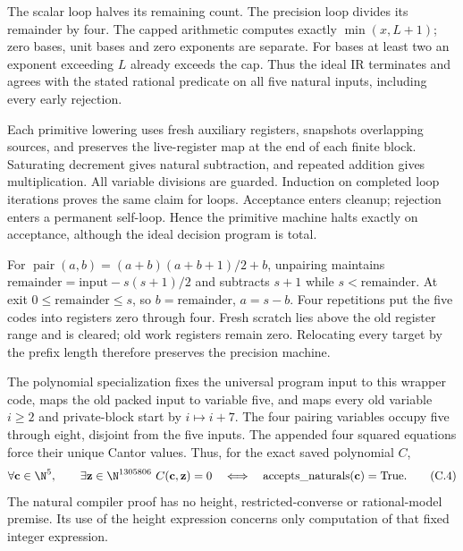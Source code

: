 The scalar loop halves its remaining count. The precision loop divides
its remainder by four. The capped arithmetic computes exactly
$\min(x,L+1)$; zero bases, unit bases and zero exponents are separate.
For bases at least two an exponent exceeding $L$ already exceeds the
cap. Thus the ideal IR terminates and agrees with the stated rational
predicate on all five natural inputs, including every early rejection.

Each primitive lowering uses fresh auxiliary registers, snapshots
overlapping sources, and preserves the live-register map at the end
of each finite block. Saturating decrement gives natural subtraction,
and repeated addition gives multiplication. All variable divisions
are guarded. Induction on completed loop iterations proves the same
claim for loops. Acceptance enters cleanup; rejection enters a
permanent self-loop. Hence the primitive machine halts exactly on
acceptance, although the ideal decision program is total.

For $\operatorname{pair}(a,b)=(a+b)(a+b+1)/2+b$, unpairing maintains
$\text{remainder}=\text{input}-s(s+1)/2$ and subtracts $s+1$
while $s<\text{remainder}$. At exit
$0\le\text{remainder}\le s$, so $b=\text{remainder}$, $a=s-b$.
Four repetitions put the five codes into registers zero through four.
Fresh scratch lies above the old register range and is cleared;
old work registers remain zero. Relocating every target by the prefix
length therefore preserves the precision machine.

The polynomial specialization fixes the universal program input to
this wrapper code, maps the old packed input to variable five, and
maps every old variable $i\ge2$ and private-block start by $i\mapsto i+7$.
The four pairing variables occupy five through eight, disjoint from
the five inputs. The appended four squared equations force their
unique Cantor values. Thus, for the exact saved polynomial $C$,
\[
 \forall\mathbf c\in\N^5,\qquad
 \exists\mathbf z\in\N^{1305806}\ C(\mathbf c,\mathbf z)=0
 \quad\Longleftrightarrow\quad
        \operatorname{accepts\_naturals}(\mathbf c)=\mathrm{True}. \tag{C.4}
\]
The natural compiler proof has no height, restricted-converse or
rational-model premise. Its use of the height expression concerns
only computation of that fixed integer expression.

